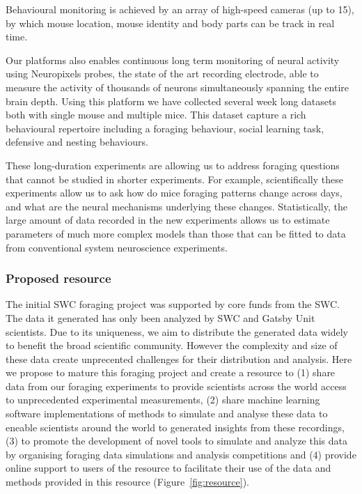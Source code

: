 Behavioural monitoring is achieved by an array of high-speed cameras (up to
15), by which mouse location, mouse identity and body parts can be track in
real time.

Our platforms also enables continuous long term monitoring of neural activity
using Neuropixels probes, the state of the art recording electrode, able to
measure the activity of thousands of neurons simultaneously spanning the entire
brain depth. Using this platform we have collected several week long datasets
both with single mouse and multiple mice. This dataset capture a rich
behavioural repertoire including a foraging behaviour,  social learning task,
defensive and nesting behaviours.

These long-duration experiments are allowing us to address foraging questions
that cannot be studied in shorter experiments. For example, scientifically
these experiments allow us to ask how do mice foraging patterns change across
days, and what are the neural mechanisms underlying these changes.
Statistically, the large amount of data recorded in the new experiments allows
us to estimate parameters of much more complex models than those that can be
fitted to data from conventional system neuroscience experiments.



\subsubsection*{Proposed resource}

The initial SWC foraging project was supported by core funds from the SWC. The
data it generated has only been analyzed by SWC and Gatsby Unit scientists. %
Due to its uniqueness, we aim to distribute the generated data widely to
benefit the broad scientific community. However the complexity and size of
these data create unprecented challenges for their distribution and analysis. %
Here we propose to mature this foraging project and create a resource to (1)
share data from our foraging experiments to provide scientists across the world
access to unprecedented experimental measurements, (2) share machine learning
software implementations of methods to simulate and analyse these data to
eneable scientists around the world to generated insights from these
recordings, (3) to promote the development of novel tools to simulate and
analyze this data by organising foraging data simulations and analysis
competitions and (4) provide online support to users of the resource to
facilitate their use of the data and methods provided in this resource
(Figure~\ref{fig:resource}).


